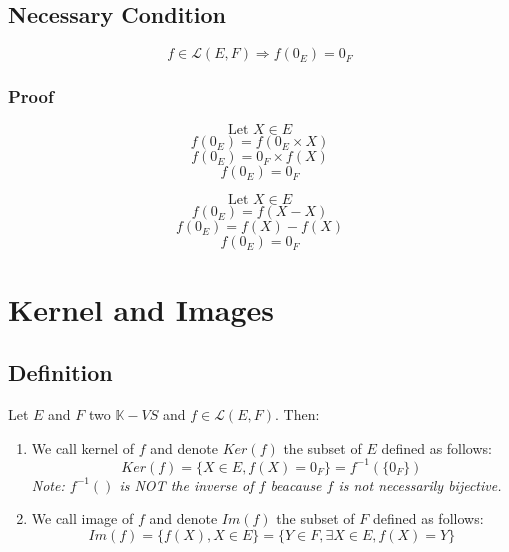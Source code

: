 \documentclass[notitlepage]{math}
\begin{document}
\subsection{Necessary Condition}
\[ f \in \mathcal{L}(E,F) \Longrightarrow f(0_E)=0_F\]
\subsubsection{Proof}
\begin{minipage}{0.4\linewidth}
    \[\text{Let } X \in E\]
    \[f(0_E) = f(0_E \times X)\]
    \[f(0_E) = 0_F \times f(X)\]
    \[f(0_E) = 0_F\]
\end{minipage}
\hfill\vline\hfill
\begin{minipage}{0.49\linewidth}
    \[\text{Let } X \in E\]
    \[f(0_E) = f(X - X) \]
    \[f(0_E) = f(X) - f(X) \]
    \[f(0_E) = 0_F\]
\end{minipage}

\newpage
\section{Kernel and Images}
\subsection{Definition}
Let $E$ and $F$ two $\mathbb{K}-VS$ and $f \in \mathcal{L}(E,F)$. Then:

\begin{enumerate}
    \item We call kernel of $f$ and denote $Ker(f)$ the subset of $E$ defined as follows: 
    \[ Ker(f) = \{X \in E, f(X) = 0_F\} = f^{-1}(\{0_F\})\]
    \textit{Note: $f^{-1}()$ is NOT the inverse of $f$ beacause $f$ is not necessarily bijective.}
    \item We call image of $f$ and denote $Im(f)$ the subset of $F$ defined as follows:
    \[ Im(f) = \{f(X), X \in E\}=\{Y \in F, \exists X \in E, f(X) = Y\}\]
\end{enumerate}
\end{document}
